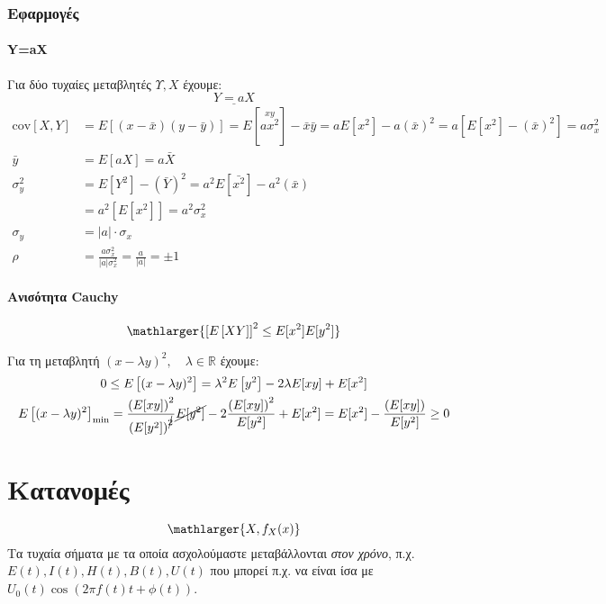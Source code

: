 \documentclass[11pt,a4paper,notitlepage,fleqn,final]{article}
\begin{document}
\subsubsection{Εφαρμογές}

\paragraph{Y=aX}
Για δύο τυχαίες μεταβλητές \( Υ,Χ \) έχουμε:
\[
\underline{Y= aX}
\]
\begin{align*}
	\mathrm{cov}[X,Y] &= E\left[(x-\bar x)(y-\bar y)\right]
	= E\left[\overset{xy}{ax^2}\right] - \bar x \bar y
	= aE[x^2]-a(\bar x)^2 = a\left[E[x^2]-(\bar x)^2\right]
	= a\sigma_x^2 \\
	\bar{y} &= E\left[ aX \right] = a \bar{X} \\
	\sigma_y^2 &= E\left[ Y^2 \right] - \left( \bar{Y} \right)^2
	= a^2 E \left[ \bar{x^2} \right] - a^2\left(\bar{x}\right) 
	\\ &= a^2\left[E\left[x^2\right]\right] = a^2\sigma_x^2 \\
	\sigma_y &= |a|\cdot\sigma_x \\
	\rho &= \frac{a\sigma_x^2}{|a|\sigma_x^2} = \frac{a}{|a|} = \pm 1
\end{align*}

\paragraph{Ανισότητα Cauchy}
\[
\mathlarger{\left[E\left[XY\right]\right]^2 \leq
E[x^2]E[y^2]}
\]

Για τη μεταβλητή \( (x-\lambda y)^2,\quad \lambda \in \mathbb R  \)
έχουμε:
\begin{gather*}
    0 \leq E\left[(x-\lambda y)^2\right] =
    \lambda^2 E\left[y^2\right] - 2\lambda E[xy]+E[x^2] \\
    E\left[(x-\lambda y)^2\right]_{\min} =
    \frac{\left(E[xy]\right)^2}{\left(E[y^2]\right)^{\cancel{2}}}
    \cancel{E[y^2]} - 2\frac{\left(E[xy]\right)^2}{E[y^2]}+E[x^2]
    = E[x^2] - \frac{\left(E[xy]\right)}{E[y^2]} \geq 0
\end{gather*}

\section{Κατανομές}
\[
\mathlarger{X,f_X(x)}
\]
Τα τυχαία σήματα με τα οποία ασχολούμαστε μεταβάλλονται
\textit{στον χρόνο}, π.χ. \( E(t), I(t), H(t), B(t), U(t) \) που μπορεί
π.χ. να είναι ίσα με \(U_0(t)\cos\left(2\pi f(t) t + \phi(t)\right) \).
\end{document}
